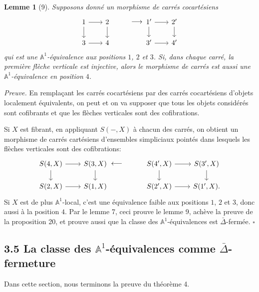 \documentclass[11pt]{article}
\newcommand{\Aone}{\mathbb A^1}
\theoremstyle{deligne}
\newtheorem*{lemma*}{Lemme}
\newenvironment{proofdel}{\noindent\textit{Preuve.}}{\hfill$\square$}
\begin{document}
\begin{lemma*}[9]
Supposons donné un morphisme de carrés cocartésiens
\[
\begin{tikzcd}[column sep=2.0em,row sep=1.5em]
1 \arrow[r] \arrow[d] & 2 \arrow[d]
&[-0.2em] \arrow[r,phantom,"\longrightarrow"] &[-0.2em]
1' \arrow[r] \arrow[d] & 2' \arrow[d] \\
3 \arrow[r] & 4 && 3' \arrow[r] & 4'
\end{tikzcd}
\]
qui est une \(\Aone\)-équivalence aux positions \(1\), \(2\) et \(3\). Si, dans chaque carré, la première flèche verticale est injective, alors le morphisme de carrés est aussi une \(\Aone\)-équivalence en position \(4\).
\end{lemma*}

\begin{proofdel}
En remplaçant les carrés cocartésiens par des carrés cocartésiens d'objets localement équivalents, on peut et on va supposer que tous les objets considérés sont cofibrants et que les flèches verticales sont des cofibrations.

Si \(X\) est fibrant, en appliquant \(S(-,X)\) à chacun des carrés, on obtient un morphisme de carrés cartésiens d'ensembles simpliciaux pointés dans lesquels les flèches verticales sont des cofibrations:
\[
\begin{tikzcd}[column sep=2.2em,row sep=1.5em]
S(4,X) \arrow[r] \arrow[d] & S(3,X) \arrow[d]
&[-0.2em] \arrow[l,phantom,"\longleftarrow"] &[-0.2em]
S(4',X) \arrow[r] \arrow[d] & S(3',X) \arrow[d] \\
S(2,X) \arrow[r] & S(1,X) && S(2',X) \arrow[r] & S(1',X).
\end{tikzcd}
\]
Si \(X\) est de plus \(\Aone\)-local, c'est une équivalence faible aux positions \(1\), \(2\) et \(3\), donc aussi à la position \(4\). Par le lemme 7, ceci prouve le lemme 9, achève la preuve de la proposition 20, et prouve aussi que la classe des \(\Aone\)-équivalences est \(\bar\Delta\)-fermée.
\end{proofdel}

\subsection*{3.5 La classe des \(\Aone\)-équivalences comme \(\bar\Delta\)-fermeture}

Dans cette section, nous terminons la preuve du théorème 4.
\end{document}
